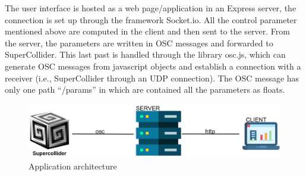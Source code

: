 \documentclass[a4paper,12pt]{report}
\begin{document}
 
The user interface is hosted as a web page/application in an Express server, the connection is set up through the framework Socket.io. All the control parameter mentioned above are computed in the client and then sent to the server. From the server, the parameters are written in OSC messages and forwarded to SuperCollider. This last past is handled through the library osc.js, which can generate OSC messages from javascript objects and establish a connection with a receiver (i.e., SuperCollider through an UDP connection). The OSC message has only one path “/params” in which are contained all the parameters as floats.

\begin{figure}[h]
\centering
\includegraphics[scale=0.4]{arch.png}
\caption{Application architecture}
\end{figure}
\end{document}

